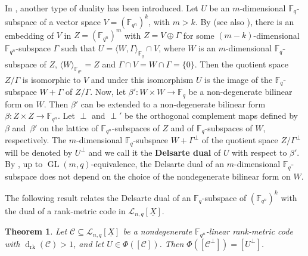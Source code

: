 \documentclass[11pt]{article}
\newtheorem{theorem}[theo]{Theorem}
\theoremstyle{definition}
\numberwithin{equation}{section}
\DeclareMathOperator{\GL}{GL}
\DeclareMathOperator{\dd}{d}
\begin{document}
In \cite[Section 3]{csajbok2021generalising}, another type of duality has been introduced. 	
	Let $U$ be an $m$-dimensional $\mathbb{F}_q$-subspace of a vector space $V=(\mathbb{F}_{q^n})^k$, with $m>k$. By \cite[Theorems 1, 2]{lunardon2004translation} (see also \cite[Theorem 1]{lunardon2002geometric}), there is an embedding of $V$ in $Z=(\mathbb{F}_{q^n})^{m}$ with $Z=V \oplus \Gamma$ for some $(m-k)$-dimensional $\mathbb{F}_{q^n}$-subspace $\Gamma$ such that
	$U=\langle W,\Gamma\rangle_{\mathbb{F}_{q}}\cap V$, where $W$ is an $m$-dimensional $\mathbb{F}_q$-subspace of $Z$, $\langle W\rangle_{\mathbb{F}_{q^n}}=Z$ and $\Gamma\cap V=W\cap \Gamma=\{{0}\}$.
	Then the quotient space $Z/\Gamma$ is isomorphic to $V$ and under this isomorphism $U$ is the image of the $\mathbb{F}_q$-subspace $W+\Gamma$ of $Z /\Gamma$.
	Now, let $\beta'\colon W\times W\rightarrow\mathbb{F}_{q}$ be a non-degenerate bilinear form on $W$. Then $\beta'$ can be extended to a non-degenerate bilinear form $\beta\colon Z\times Z\rightarrow\mathbb{F}_{q^n}$.
	Let $\perp$ and $\perp'$ be the orthogonal complement maps defined by~$\beta$ and~$\beta'$ on the lattice of $\mathbb{F}_{q^n}$-subspaces of $Z$ and of $\mathbb{F}_q$-subspaces of $W$, respectively.
	The $m$-dimensional $\mathbb{F}_q$-subspace $W+\Gamma^{\perp}$ of the quotient space $Z/\Gamma^{\perp}$  will be denoted by $U^\perp$ and we call it the \textbf{Delsarte dual} of $U$ with respect to $\beta'$. By \cite[Remark~3.7]{csajbok2021generalising}, up to $\GL(m,q)$-equivalence,  the Delsarte dual of an $m$-dimensional $\mathbb{F}_q$-subspace does not depend on the choice of the nondegenerate bilinear form on $W$. 	

The following result relates the Delsarte dual of an $\mathbb{F}_q$-subspace of $(\mathbb{F}_{q^n})^k$ with the dual of a rank-metric code in $\mathcal{L}_{n,q}[\underline{X}]$.

\begin{theorem}\label{thm:duality_delsarte_codes}
Let $\mathcal{C}\subseteq \mathcal{L}_{n,q}[\underline{X}]$ be a nondegenerate ${\mathbb F}_{q^n}$-linear rank-metric code with ${\dd_{\mathrm{rk}}}(\mathcal{C})>1$, and let $U\in \Phi([\mathcal{C}])$. 
Then $\Phi([\mathcal{C}^\perp])=[U^\perp]$.
\end{theorem}
\end{document}
